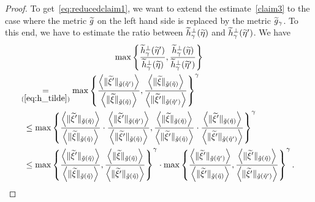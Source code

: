 \documentclass[10pt]{amsart}
\theoremstyle{definition}\newtheorem{defi}[theo]{Definition}\newtheorem{rema}[theo]{Remark}\newtheorem{exam}[theo]{Example}\newtheorem{exem}[theo]{Example}\newtheorem{nota}[theo]{Notation}
\newcommand*\eq[1]{\underset{(#1)}{=}}
\let\oldtilde\tilde
\renewcommand*{\tilde}[1]{\mathchoice{\widetilde{#1}}{\widetilde{#1}}{\oldtilde{#1}}{\oldtilde{#1}}}
\begin{document}
\begin{proof}
To get~\eqref{eq:reducedclaim1}, we want to extend the estimate~\eqref{claim3} to the case where the metric $\tilde{g}$ on the left hand side is replaced by the metric $\tilde{g}_{\gamma}$. To this end, we have to estimate the ratio between $\tilde{h}_{\gamma}^{\perp}(\tilde{\eta})$ and $\tilde{h}_{\gamma}^{\perp}(\tilde{\eta}')$. We have
\begin{multline}\label{eq:vg}
\max  \left\{ \frac{\tilde{h}_{\gamma}^{\perp}(\tilde{\eta}')}{\tilde{h}_{\gamma}^{\perp}(\tilde{\eta})},\frac{\tilde{h}_{\gamma}^{\perp}(\tilde{\eta})}{\tilde{h}_{\gamma}^{\perp}(\tilde{\eta}')}\right\}\\
\begin{aligned}
&\mkern-10mu\eq{\ref{eq:h_tilde}}\max\left\{ \frac{\left\langle\|\tilde{\xi}'\|_{\tilde{g}\left(\tilde{\eta}'\right)}\right\rangle}{\left\langle\|\tilde{\xi}\|_{\tilde{g}\left(\tilde{\eta}\right)}\right\rangle},\frac{\left\langle\|\tilde{\xi}\|_{\tilde{g}\left(\tilde{\eta}\right)}\right\rangle}{\left\langle\|\tilde{\xi}'\|_{\tilde{g}\left(\tilde{\eta}'\right)}\right\rangle}\right\} ^{\gamma}\\
& \le\max\left\{ \frac{\left\langle\|\tilde{\xi}'\|_{\tilde{g}\left(\tilde{\eta}\right)}\right\rangle}{\left\langle\|\tilde{\xi}\|_{\tilde{g}\left(\tilde{\eta}\right)}\right\rangle}\cdot\frac{\left\langle\|\tilde{\xi}'\|_{\tilde{g}\left(\tilde{\eta}'\right)}\right\rangle}{\left\langle\|\tilde{\xi}'\|_{\tilde{g}\left(\tilde{\eta}\right)}\right\rangle},\frac{\left\langle\|\tilde{\xi}\|_{\tilde{g}\left(\tilde{\eta}\right)}\right\rangle}{\left\langle\|\tilde{\xi}'\|_{\tilde{g}\left(\tilde{\eta}\right)}\right\rangle}\cdot\frac{\left\langle\|\tilde{\xi}'\|_{\tilde{g}\left(\tilde{\eta}\right)}\right\rangle}{\left\langle\|\tilde{\xi}'\|_{\tilde{g}\left(\tilde{\eta}'\right)}\right\rangle}\right\} ^{\gamma}\\
& \le\max\left\{ \frac{\left\langle\|\tilde{\xi}'\|_{\tilde{g}\left(\tilde{\eta}\right)}\right\rangle}{\left\langle\|\tilde{\xi}\|_{\tilde{g}\left(\tilde{\eta}\right)}\right\rangle},\frac{\left\langle\|\tilde{\xi}\|_{\tilde{g}\left(\tilde{\eta}\right)}\right\rangle}{\left\langle\|\tilde{\xi}'\|_{\tilde{g}\left(\tilde{\eta}\right)}\right\rangle}\right\}^{\gamma}\cdot\max\left\{ \frac{\left\langle\|\tilde{\xi}'\|_{\tilde{g}\left(\tilde{\eta}'\right)}\right\rangle}{\left\langle\|\tilde{\xi}'\|_{\tilde{g}\left(\tilde{\eta}\right)}\right\rangle},\frac{\left\langle\|\tilde{\xi}'\|_{\tilde{g}\left(\tilde{\eta}\right)}\right\rangle}{\left\langle\|\tilde{\xi}'\|_{\tilde{g}\left(\tilde{\eta}'\right)}\right\rangle}\right\} ^{\gamma}.

\end{aligned}
\end{multline}
\end{proof}
\end{document}
